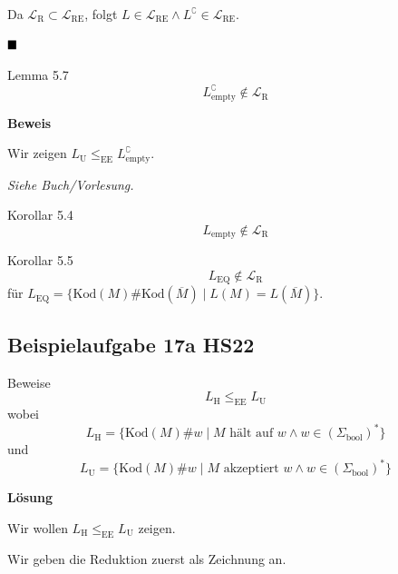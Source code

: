 \documentclass[a4paper, 11pt]{article}
\def\Lre{\mathcal{L}_\text{RE}}
\def\Lr{\mathcal{L}_\text{R}}
\begin{document}
                    Da $\Lr \subset \Lre$, folgt $L \in \Lre \land L^\complement \in \Lre$.
                
                    $\hfill\blacksquare$
                
                
                    \begin{mainbox}{Lemma 5.7}
                        $$L_{\text{empty}}^\complement \notin \Lr$$
                    \end{mainbox}
                    \textbf{Beweis }
                
                    Wir zeigen $L_{\text{U}} \leq_{\text{EE}} L_{\text{empty}}^\complement$.
                
                    \textit{Siehe Buch/Vorlesung.}
                   
                
                    \begin{subbox}{Korollar 5.4}
                        $$L_{\text{empty}} \notin \Lr$$
                    \end{subbox}
                    \begin{subbox}{Korollar 5.5}
                        $$L_{\text{EQ}} \notin \Lr$$
                        für $L_{\text{EQ}} = \{\text{Kod}(M)\#\text{Kod}(\overline{M}) \mid L(M) = L(\overline{M})\}$.
                    \end{subbox}
                
                    \subsection{Beispielaufgabe 17a HS22}

                    Beweise $$L_{\text{H}} \leq_{\text{EE}} L_{\text{U}}$$
                    wobei 
                    $$L_{\text{H}} = \{\text{Kod}(M)\#w \mid M\text{ hält auf }w\land w \in (\Sigma_{\text{bool}})^*\}$$
                    und 
                    $$L_{\text{U}}=\{\text{Kod}(M)\#w \mid M \text{ akzeptiert }w \land w \in (\Sigma_{\text{bool}})^*\}$$
                
                
                    \textbf{Lösung}
                
                    Wir wollen $L_{\text{H}} \leq_{\text{EE}} L_{\text{U}}$ zeigen.
                
                        Wir geben die Reduktion zuerst als Zeichnung an.
                
\end{document}
